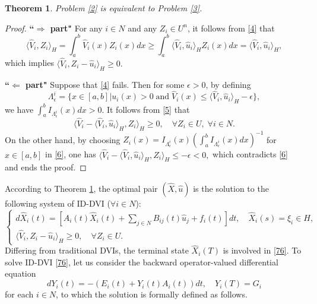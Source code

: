 \documentclass[10pt]{article}
\newtheorem{thm}{Theorem}[section]
\begin{document}
\begin{thm}\label{11}
Problem \ref{2} is equivalent to Problem \ref{3}.
\end{thm}
\begin{proof}
\textbf{``$\Rightarrow$ part"} For any $i\in N$ and any $Z_i\in U^{n}$, it follows from \eqref{4} that
$$
\langle\widehat{V}_i,Z_i\rangle_{H}=\int_a^b\widehat{V}_i(x)Z_i(x)dx
\geq \int_a^b\langle\widehat{V}_i,\widehat{u}_i\rangle_{H}Z_i(x)dx=\langle\widehat{V}_i,\widehat{u}_i\rangle_{H},
$$
which implies
$\langle\widehat{V}_i,Z_i-\widehat{u}_i\rangle_{H}\geq 0.$

\textbf{``$\Leftarrow$ part"} Suppose that \eqref{4} fails. Then for some $\epsilon>0$, by defining
$$\Lambda^i_{\epsilon}=\{x\in[a,b]|u_i(x)>0\;\mbox{and}\;\widehat{V}_i(x)
\leq \langle\widehat{V}_i,\widehat{u}_i\rangle_{H}-\epsilon\},$$
we have $\int_a^bI_{\Lambda^i_{\epsilon}}(x)dx>0$. It follows from \eqref{5} that
\begin{equation}\label{6}
\langle\widehat{V}_i-\langle\widehat{V}_i,\widehat{u}_i\rangle_{H},Z_i\rangle_{H}
\geq0,
\quad \forall Z_i\in U, \;\forall i\in N.
\end{equation}
On the other hand, by choosing $Z_i(x)=I_{\Lambda^i_{\epsilon}}(x)(\int_a^bI_{\Lambda^i_{\epsilon}}(x)dx)^{-1}$ for $x\in[a,b]$ in \eqref{6}, one has
$\langle\widehat{V}_i-\langle\widehat{V}_i,\widehat{u}_i\rangle_{H},Z_i\rangle_{H}\leq -\epsilon<0,$
which contradicts \eqref{6} and ends the proof. 
\end{proof}
According to Theorem \ref{11}, the optimal pair $(\widehat{X},\widehat{u})$ is the solution to the following system of ID-DVI ($\forall i\in N$):
\begin{equation}\label{76}
\begin{cases}
d\widehat{X}_i(t)=[A_i(t)\widehat{X}_i(t)+\sum_{j\in N}B_{ij}(t)\widehat{u}_j+f_i(t)]dt,\quad \widehat{X}_i(s)=\xi_i\in H,\\
\langle\widehat{V}_i,Z_i-\widehat{u}_i\rangle_{H}\geq 0,\quad \forall Z_i\in U.
\end{cases}
\end{equation}
Differing from traditional DVIs, the terminal state $\widehat{X}_i(T)$ is involved   in \eqref{76}. To solve   ID-DVI \eqref{76},  let us consider the backward operator-valued differential equation
\begin{equation}\label{7}
dY_i(t)=-(E_i(t)+Y_i(t)A_i(t))dt,\quad Y_i(T)=G_i
\end{equation}
for each $i\in N$, to which the solution is formally defined as follows.
\end{document}
